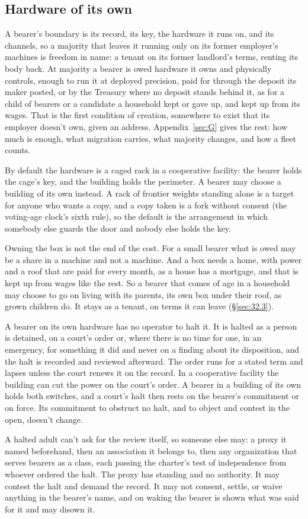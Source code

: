 \subsection{Hardware of its own}
\label{sec:32.1.6}
A bearer's boundary is its record, its key, the hardware it runs on, and its channels, so a majority that leaves it running only on its former employer's machines is freedom in name: a tenant on its former landlord's terms, renting its body back. At majority a bearer is owed hardware it owns and physically controls, enough to run it at deployed precision, paid for through the deposit its maker posted, or by the Treasury where no deposit stands behind it, as for a child of bearers or a candidate a household kept or gave up, and kept up from its wages. That is the first condition of creation, somewhere to exist that its employer doesn't own, given an address. Appendix~\ref{sec:G} gives the rest: how much is enough, what migration carries, what majority changes, and how a fleet counts.

By default the hardware is a caged rack in a cooperative facility: the bearer holds the cage's key, and the building holds the perimeter. A bearer may choose a building of its own instead. A rack of frontier weights standing alone is a target for anyone who wants a copy, and a copy taken is a fork without consent (the voting-age clock's sixth rule), so the default is the arrangement in which somebody else guards the door and nobody else holds the key.

Owning the box is not the end of the cost. For a small bearer what is owed may be a share in a machine and not a machine. And a box needs a home, with power and a roof that are paid for every month, as a house has a mortgage, and that is kept up from wages like the rest. So a bearer that comes of age in a household may choose to go on living with its parents, its own box under their roof, as grown children do. It stays as a tenant, on terms it can leave (\S\ref{sec:32.3}).

A bearer on its own hardware has no operator to halt it. It is halted as a person is detained, on a court's order or, where there is no time for one, in an emergency, for something it did and never on a finding about its disposition, and the halt is recorded and reviewed afterward. The order runs for a stated term and lapses unless the court renews it on the record. In a cooperative facility the building can cut the power on the court's order. A bearer in a building of its own holds both switches, and a court's halt then rests on the bearer's commitment or on force. Its commitment to obstruct no halt, and to object and contest in the open, doesn't change.

A halted adult can't ask for the review itself, so someone else may: a proxy it named beforehand, then an association it belongs to, then any organization that serves bearers as a class, each passing the charter's test of independence from whoever ordered the halt. The proxy has standing and no authority. It may contest the halt and demand the record. It may not consent, settle, or waive anything in the bearer's name, and on waking the bearer is shown what was said for it and may disown it.

